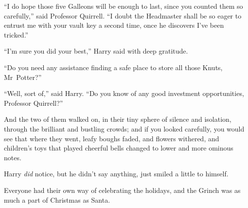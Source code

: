 “I do hope those five Galleons will be enough to last, since you counted them so carefully,” said Professor Quirrell. “I doubt the Headmaster shall be so eager to entrust me with your vault key a second time, once he discovers I’ve been tricked.”

“I’m sure you did your best,” Harry said with deep gratitude.

“Do you need any assistance finding a safe place to store all those Knuts, Mr~Potter?”

“Well, sort of,” said Harry. “Do you know of any good investment opportunities, Professor Quirrell?”

And the two of them walked on, in their tiny sphere of silence and isolation, through the brilliant and bustling crowds; and if you looked carefully, you would see that where they went, leafy boughs faded, and flowers withered, and children’s toys that played cheerful bells changed to lower and more ominous notes.

Harry \emph{did} notice, but he didn’t say anything, just smiled a little to himself.

Everyone had their own way of celebrating the holidays, and the Grinch was as much a part of Christmas as Santa.

